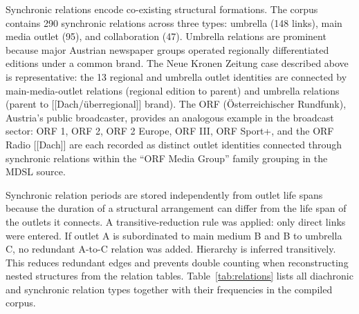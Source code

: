 \documentclass[11pt]{article}
\begin{document}
Synchronic relations encode co-existing structural formations. The corpus contains 290 synchronic relations across three types: umbrella (148 links), main media outlet (95), and collaboration (47). Umbrella relations are prominent because major Austrian newspaper groups operated regionally differentiated editions under a common brand. The Neue Kronen Zeitung case described above is representative: the 13 regional and umbrella outlet identities are connected by main-media-outlet relations (regional edition to parent) and umbrella relations (parent to [[Dach/\"uberregional]] brand). The ORF (\"Osterreichischer Rundfunk), Austria's public broadcaster, provides an analogous example in the broadcast sector: ORF 1, ORF 2, ORF 2 Europe, ORF III, ORF Sport+, and the ORF Radio [[Dach]] are each recorded as distinct outlet identities connected through synchronic relations within the ``ORF Media Group'' family grouping in the MDSL source.

Synchronic relation periods are stored independently from outlet life spans because the duration of a structural arrangement can differ from the life span of the outlets it connects. A transitive-reduction rule was applied: only direct links were entered. If outlet A is subordinated to main medium B and B to umbrella C, no redundant A-to-C relation was added. Hierarchy is inferred transitively. This reduces redundant edges and prevents double counting when reconstructing nested structures from the relation tables. Table~\ref{tab:relations} lists all diachronic and synchronic relation types together with their frequencies in the compiled corpus.
\end{document}
